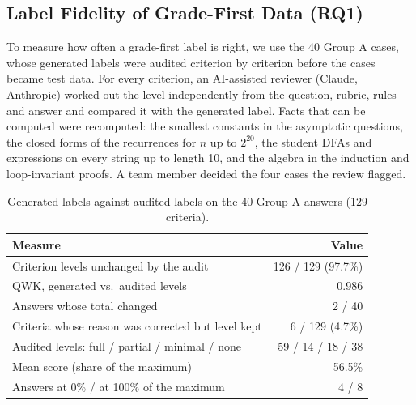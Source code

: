 \documentclass[11pt,a4paper]{article}
\newcommand{\lvl}[1]{\textsf{#1}}
\theoremstyle{definition}
\begin{document}
\subsection{Label Fidelity of Grade-First Data (RQ1)}\label{sec:res_data}
To measure how often a grade-first label is right, we use the 40 Group A cases, whose generated labels were audited criterion by criterion before the cases became test data. For every criterion, an AI-assisted reviewer (Claude, Anthropic) worked out the level independently from the question, rubric, rules and answer and compared it with the generated label. Facts that can be computed were recomputed: the smallest constants in the asymptotic questions, the closed forms of the recurrences for $n$ up to $2^{20}$, the student DFAs and expressions on every string up to length 10, and the algebra in the induction and loop-invariant proofs. A team member decided the four cases the review flagged.

\begin{table}[t]
\centering
\caption{Generated labels against audited labels on the 40 Group A answers (129 criteria).}
\label{tab:fidelity}
\small
\begin{tabular}{lr}
\toprule
Measure & Value\\
\midrule
Criterion levels unchanged by the audit & 126 / 129 (97.7\%)\\
QWK, generated vs.\ audited levels & 0.986\\
Answers whose total changed & 2 / 40\\
Criteria whose reason was corrected but level kept & 6 / 129 (4.7\%)\\
\midrule
Audited levels: \lvl{full} / \lvl{partial} / \lvl{minimal} / \lvl{none} & 59 / 14 / 18 / 38\\
Mean score (share of the maximum) & 56.5\%\\
Answers at 0\% / at 100\% of the maximum & 4 / 8\\
\bottomrule
\end{tabular}
\end{table}
\end{document}
